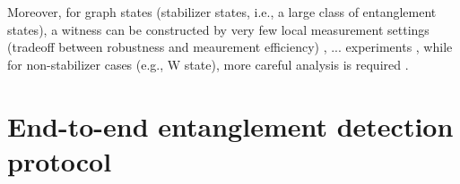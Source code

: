 \documentclass[
aps,
pra,
twocolumn,
floatfix,
]{revtex4-2}
\theoremstyle{plain}
\theoremstyle{definition}
\newcommand{\ew}{W}
\newcommand{\ghz}{\text{GHZ}}
\newcommand{\px}{X}
\newcommand{\pz}{Z}
\begin{document}
Moreover, for graph states (stabilizer states, i.e., a large class of entanglement states),
a witness can be constructed by very few local measurement settings (tradeoff between robustness and meaurement efficiency) \cite{tothDetectingGenuineMultipartite2005} \cite{tothEntanglementDetectionStabilizer2005} \cite{zhouDetectingMultipartiteEntanglement2019},
... experiments
\cite{luEntanglementStructureEntanglement2018}
\cite{zhouSchemeCreateVerify2022},
while for non-stabilizer cases (e.g., W state), more careful analysis is required \cite{zhangEfficientEntanglementGeneration2021} \cite{zhuMachineLearningDerivedEntanglement2021}.

\section{End-to-end entanglement detection protocol}\label{sec:protocol}
\end{document}
